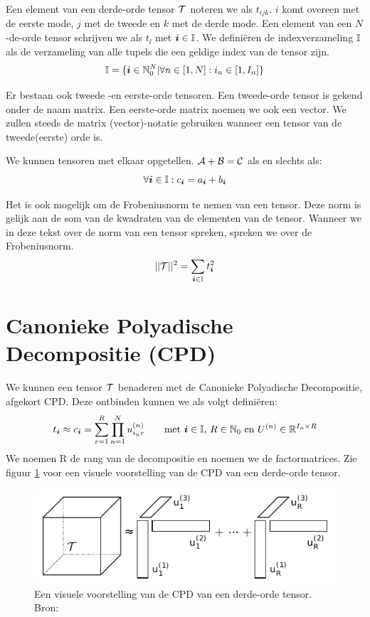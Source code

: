 Een element van een derde-orde tensor $\mathcal{T}$ noteren we als $t_{ijk}$. $i$ komt overeen met de eerste mode, $j$ met de tweede en $k$ met de derde mode. Een element van een $N$-de-orde tensor schrijven we als $t_{\ii{}}$ met $\boldsymbol{i}{} \in \mathbb{I}$. We defini\"eren de indexverzameling $\mathbb{I}$ als de verzameling van alle tupels die een geldige index van de tensor zijn.
\[
    \mathbb{I} = \{\boldsymbol{i}{} \in \mathbb{N}_0^N | \forall n \in [1, N]: i_n \in [1, I_n]\}
\]


Er bestaan ook tweede -en eerste-orde tensoren. Een tweede-orde tensor is gekend onder de naam matrix. Een eerste-orde matrix noemen we ook een vector. We zullen steeds de matrix (vector)-notatie gebruiken wanneer een tensor van de tweede(eerste) orde is.

We kunnen tensoren met elkaar opgetellen. $\mathcal{A} + \mathcal{B} = \mathcal{C}$ als en slechts als:
\[
	\forall \boldsymbol{i}{} \in \mathbb{I}: c_{\boldsymbol{i}{}} = a_{\boldsymbol{i}{}} + b_{\boldsymbol{i}{}}
\]

Het is ook mogelijk om de Frobeniusnorm te nemen van een tensor. Deze norm is gelijk aan de som van de kwadraten van de elementen van de tensor. Wanneer we in deze tekst over de norm van een tensor spreken, spreken we over de Frobeniusnorm.
\[
	||\mathcal{T}||^2 = \sum_{\boldsymbol{i}{} \in \mathbb{I}} t_{\boldsymbol{i}{}}^2
\]

\section{Canonieke Polyadische Decompositie (CPD)}
We kunnen een tensor $\mathcal{T}$ benaderen met de Canonieke Polyadische Decompositie, afgekort CPD. %
Deze ontbinden kunnen we als volgt defini\"eren:
\[
    t_{\boldsymbol{i}{}} \approx c_{\boldsymbol{i}{}} = \sum_{r=1}^{R} \prod_{n=1}^{N} u^{(n)}_{i_{n}r} \qquad
    \text{met $\boldsymbol{i}{} \in \mathbb{I}$, $R \in \mathbb{N}_0$ en $U^{(n)} \in \mathbb{R}^{I_n \times R} $}
\]
We noemen R de rang van de decompositie en \UUU{} noemen we de factormatrices. Zie figuur \ref{cpdTekening} voor een visuele voorstelling van de CPD van een derde-orde tensor.

\begin{figure}
\centering
\includegraphics{cpd}
\caption{\label{cpdTekening}Een visuele voorstelling van de CPD van een derde-orde tensor. Bron: \cite[p.~4]{laurent}}
\end{figure}

